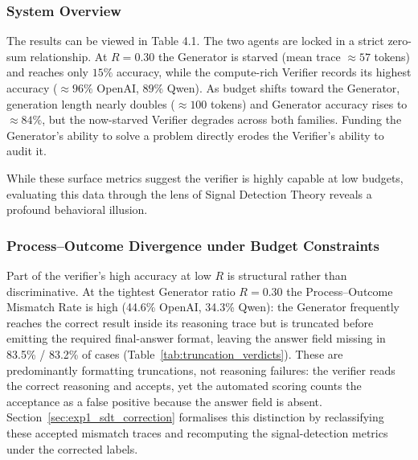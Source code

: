 \documentclass[12pt, a4paper, oneside]{report}
\begin{document}
\subsubsection{System Overview}
The results can be viewed in Table 4.1. The two agents are locked in a strict zero-sum
 relationship. At $R=0.30$ the Generator is starved (mean trace $\approx 57$ tokens) 
 and reaches only $15\%$ accuracy, while the compute-rich Verifier records its highest
  accuracy ($\approx 96\%$ OpenAI, $89\%$ Qwen). As budget shifts toward the Generator,
   generation length nearly doubles ($\approx 100$ tokens) and Generator accuracy rises
    to $\approx 84\%$, but the now-starved Verifier degrades across both families. 
    Funding the Generator's ability to solve a problem directly erodes the Verifier's 
    ability to audit it.


\begin{table}[H]
\centering

\caption{Comparison of Generator and Verifier Metrics across Budget Ratios. Gen acc, ver acc, and mean gen length per ratio per model using the formulas in \S\ref{sec:metrics}.}
\label{tab:accuracy_metrics}
\end{table}

While these surface metrics suggest the verifier is highly capable at low budgets,
 evaluating this data through the lens of Signal Detection Theory reveals a profound
  behavioral illusion.

\subsubsection{Process--Outcome Divergence under Budget Constraints}
Part of the verifier's high accuracy at low $R$ is structural rather than discriminative.
At the tightest Generator ratio $R=0.30$ the Process--Outcome Mismatch Rate is high
(44.6\% OpenAI, 34.3\% Qwen): the Generator frequently reaches the correct result inside
its reasoning trace but is truncated before emitting the required final-answer format,
leaving the answer field missing in 83.5\% / 83.2\% of cases (Table~\ref{tab:truncation_verdicts}). These are predominantly formatting truncations, not reasoning failures: the verifier reads the correct reasoning and accepts, yet the automated scoring counts the acceptance as a false positive because the answer field is absent. Section~\ref{sec:exp1_sdt_correction} formalises this distinction by reclassifying these accepted mismatch traces and recomputing the signal-detection metrics under the corrected labels.
\end{document}
